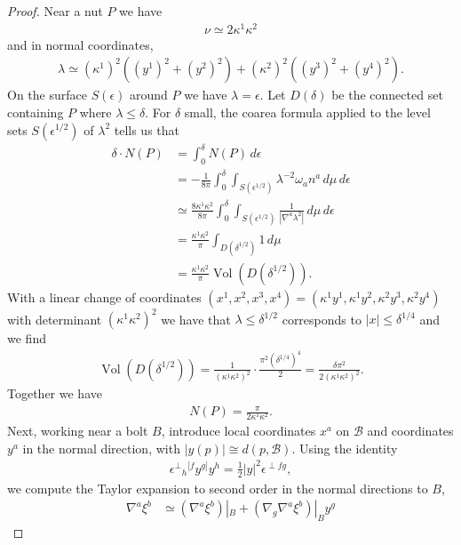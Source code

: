 \documentclass[a4paper,11pt,reqno]{amsart}
\newcommand{\nut}{P}
\newcommand{\bolt}{B}
\newcommand{\cB}{\mathcal{B}}
\theoremstyle{plain}
\numberwithin{equation}{section}
\newcommand{\eps}{\epsilon}
\begin{document}
\begin{proof}
Near a nut $\nut$ we have
\begin{align}
\nu \simeq 2 \kappa^1 \kappa^2
\end{align}
and in normal coordinates,
\begin{align}
\lambda \simeq 
(\kappa^1)^2 \left( (y^1)^2 + (y^2)^2 \right)
+ (\kappa^2)^2 \left( (y^3)^2 + (y^4)^2 \right).
\end{align}
On the surface $S(\eps)$ around $\nut$ we have $\lambda = \eps$. Let $D(\delta)$ be the connected set containing $\nut$ where $\lambda \leq \delta$. For $\delta$ small, the coarea formula  applied to the level sets $S(\eps^{1/2})$ of $\lambda^2$ tells us that
\begin{align}
\delta \cdot N(\nut)
&= \int_0^\delta N(\nut) \, d\epsilon \\
&= -\frac{1}{8\pi} \int_0^\delta 
\int_{S(\eps^{1/2})} \lambda^{-2} \omega_a n^a \, d\mu 
\, d\epsilon \\
&\simeq 
\frac{8 \kappa^1 \kappa^2}{8\pi} \int_0^\delta 
\int_{S(\eps^{1/2})} \frac{1}{|\nabla^a \lambda^2|} \, d\mu
\, d\epsilon \\
&= 
\frac{\kappa^1 \kappa^2}{\pi} \int_{D(\delta^{1/2})} 1 \, d\mu \\
&= 
\frac{\kappa^1 \kappa^2}{\pi} \operatorname{Vol}(D(\delta^{1/2})).
\end{align} 
With a linear change of coordinates $(x^1,x^2,x^3,x^4) = (\kappa^1 y^1,\kappa^1 y^2,\kappa^2 y^3,\kappa^2 y^4)$ with determinant $(\kappa^1 \kappa^2)^2$ we have that $\lambda \leq \delta^{1/2}$ corresponds to $|x| \leq \delta^{1/4}$ and we find 
\begin{align}
\operatorname{Vol}(D(\delta^{1/2})) 
= \frac{1}{(\kappa^1 \kappa^2)^2} \cdot \frac{\pi^2(\delta^{1/4})^4}{2}
= \frac{\delta \pi^2}{2(\kappa^1 \kappa^2)^2}.
\end{align}
Together we have 
\begin{align}
N(\nut) = \frac{\pi}{2\kappa^1 \kappa^2}.
\end{align}
%
Next, working near a bolt $\bolt$, introduce local coordinates $x^a$ on $\cB$ and coordinates $y^a$ in the normal direction, with $|y(p)| \cong d(p,\cB)$. Using the identity 
\begin{align}
\eps^{\perp}{}_h{}^{[f} y^{g]} y^h = \frac{1}{2} |y|^2 \eps^{\perp fg},
\end{align}
we compute the Taylor expansion to second order in the normal directions to $\bolt$,
\begin{align}
\nabla^a \xi^b 
&\simeq 
(\nabla^a \xi^b)|_\bolt + (\nabla_g \nabla^a \xi^b)|_\bolt y^g

\end{align}
\end{proof}
\end{document}
